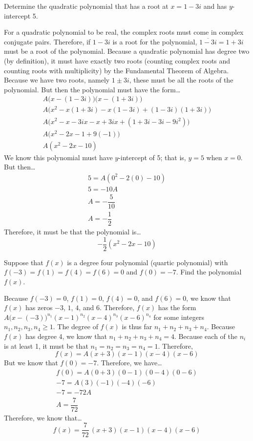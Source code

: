 \documentclass[11pt,letterpaper]{article}
\begin{document}
\newpage



 Determine the quadratic polynomial that has a root at $x= 1 - 3i$ and has $y$-intercept 5. \pspace

\sol For a quadratic polynomial to be real, the complex roots must come in complex conjugate pairs. Therefore, if $1 - 3i$ is a root for the polynomial, $\overline{1 - 3i}= 1 + 3i$ must be a root of the polynomial. Because a quadratic polynomial has degree two (by definition), it must have exactly two roots (counting complex roots and counting roots with multiplicity) by the Fundamental Theorem of Algebra. Because we have two roots, namely $1 \pm 3i$, these must be all the roots of the polynomial. But then the polynomial must have the form\dots
	\[
	\begin{gathered}
	A \big(x - (1 - 3i) \big) \big(x - (1 + 3i) \big) \\[0.3cm]
	A (x^2 - x(1 + 3i) - x(1 - 3i) + (1 - 3i)(1 + 3i) \big) \\[0.3cm]
	A \big(x^2 - x - 3ix - x + 3ix + (1 + 3i - 3i - 9i^2) \big) \\[0.3cm]
	A \big(x^2 - 2x - 1 + 9(-1) \big) \\[0.3cm]
	A(x^2 - 2x - 10) 
	\end{gathered}
	\]  \pspace
We know this polynomial must have $y$-intercept of 5; that is, $y= 5$ when $x= 0$. But then\dots
	\[
	\begin{gathered}
	5= A(0^2 - 2(0) - 10) \\
	5= -10A \\
	A= -\dfrac{5}{10} \\
	A= -\dfrac{1}{2}
	\end{gathered}
	\] \pspace
Therefore, it must be that the polynomial is\dots
	\[
	-\dfrac{1}{2} (x^2 - 2x - 10)
	\]



\newpage



 Suppose that $f(x)$ is a degree four polynomial (quartic polynomial) with $f(-3)= f(1)= f(4)= f(6)= 0$ and $f(0)= -7$. Find the polynomial $f(x)$. \pspace

\sol Because $f(-3)= 0$, $f(1)= 0$, $f(4)= 0$, and $f(6)= 0$, we know that $f(x)$ has zeros $-3$, $1$, $4$, and $6$. Therefore, $f(x)$ has the form $A \big(x - (-3) \big)^{n_1} (x - 1)^{n_2} (x - 4)^{n_3} (x - 6)^{n_4}$ for some integers $n_1, n_2, n_3, n_4 \geq 1$. The degree of $f(x)$ is thus far $n_1 + n_2 + n_3 + n_4$. Because $f(x)$ has degree 4, we know that $n_1 + n_2 + n_3 + n_4= 4$. Because each of the $n_i$ is at least 1, it must be that $n_1= n_2= n_3= n_4= 1$. Therefore, 
	\[
	f(x)= A (x + 3)(x - 1)(x - 4)(x - 6)
	\] \pspace
But we know that $f(0)= -7$. Therefore, we have\dots
	\[
	\begin{gathered}
	f(0)= A(0 + 3)(0 - 1)(0 - 4)(0 - 6) \\[0.3cm]
	-7= A(3)(-1)(-4)(-6) \\[0.3cm]
	-7= -72A \\[0.3cm]
	A= \dfrac{7}{72}
	\end{gathered}
	\]
Therefore, we know that\dots
	\[
	f(x)= \dfrac{7}{72}\, (x + 3)(x - 1)(x - 4)(x - 6)
	\]
\end{document}
